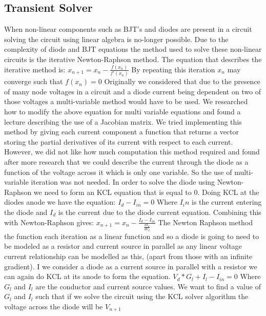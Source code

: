 \documentclass{article}
\begin{document}
\subsection{Transient Solver}\label{ssec:TransientSolver}
When non-linear components such as BJT's and diodes are present in a circuit solving the circuit using linear algebra is no-longer possible. Due to the complexity of diode and BJT equations the method used to solve these non-linear circuits is the iterative Newton-Raphson method. The equation that describes the iterative method is:
\bigbreak $x_{n+1} = x_n - \frac{f(x_n)}{f'(x_n)}$\bigbreak
By repeating this iteration $x_n$ may converge such that $f(x_n) = 0$
Originally we considered that due to the presence of many node voltages in a circuit and a diode current being dependent on two of those voltages a multi-variable method would have to be used. We researched how to modify the above equation for multi variable equations and found a lecture\cite{mulitvariableNR} describing the use of a Jacobian matrix. We tried implementing this method by giving each current component a function that returns a vector storing the partial derivatives of its current with respect to each current. However, we did not like how much computation this method required and found after more research\cite{NewtonRaphson} that we could describe the current through the diode as a function of the voltage across it which is only one variable\cite{LinearCompanionModels}. So the use of multi-variable iteration was not needed. In order to solve the diode using Newton-Raphson we need to form an KCL equation that is equal to 0. Doing KCL at the diodes anode we have the equation:
\bigbreak $I_d - I_{in} = 0$\bigbreak
Where $I_in$ is the current entering the diode and $I_d$ is the current due to the diode current equation. Combining this with Newton-Raphson gives:
\bigbreak $x_{n+1} = x_n - \frac{I_d - I_{in}}{\frac{d I_d}{d V_d}}$\bigbreak
The Newton Raphson method the function each iteration as a linear function and so a diode is going to need to be modeled as a resistor and current source in parallel as any linear voltage current relationship can be modelled as this, (apart from those with an infinite gradient). I we consider a diode as a current source in parallel with a resistor we can again do KCL at its anode to form the equation. 
\bigbreak $V_d*G_l + I_l - I_{in} = 0$ Where $G_l$ and $I_l$ are the conductor and current source values.\bigbreak
We want to find a value of $G_l$ and $I_l$ such that if we solve the circuit using the KCL solver algorithm the voltage across the diode will be $V_{n+1}$
\end{document}
